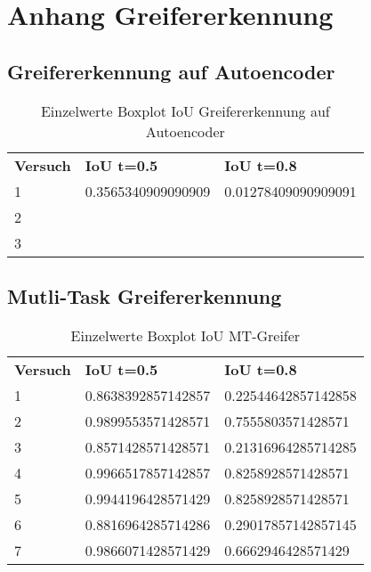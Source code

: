 \chapter{Anhang  Greifererkennung}
\label{appendix:Greifererkennung}

	\section{Greifererkennung auf Autoencoder}
	\label{appendix:GreifererkennungAufAutoencoder}
	
		\begin{table}[ht]
		\centering
		\begin{tabularx}{\textwidth}{lll}
			\textbf{Versuch}  & \textbf{IoU t=0.5} & \textbf{IoU t=0.8}  	 \\
			1 & 0.3565340909090909  & 0.01278409090909091 \\
			2 &   &  \\
			3 &  & \\
		
			
		\end{tabularx}
		\caption{Einzelwerte Boxplot IoU Greifererkennung auf Autoencoder}
		\label{table:EinzelwerteBoxplotIoUGreifererkennungaufAutoencoder}
	\end{table}

	\section{Mutli-Task Greifererkennung}
	\label{appendix:MutliTaskGreifererkennung}
	
	\begin{table}[ht]
	\centering
	\begin{tabularx}{\textwidth}{lll}
		 \textbf{Versuch}  & \textbf{IoU t=0.5} & \textbf{IoU t=0.8}  	 \\
		1 & 0.8638392857142857  & 0.22544642857142858 \\
		2 & 0.9899553571428571   & 0.7555803571428571 \\
		3 & 0.8571428571428571  & 0.21316964285714285 \\
		4 & 0.9966517857142857   & 0.8258928571428571 \\
		5 & 0.9944196428571429  & 0.8258928571428571  \\
		6 & 0.8816964285714286   & 0.29017857142857145 \\
		7 & 0.9866071428571429  & 0.6662946428571429 \\
	
	\end{tabularx}
	\caption{Einzelwerte Boxplot IoU MT-Greifer}
	\label{table:EinzelwerteBoxplotIoUMTGreifer}
\end{table}

